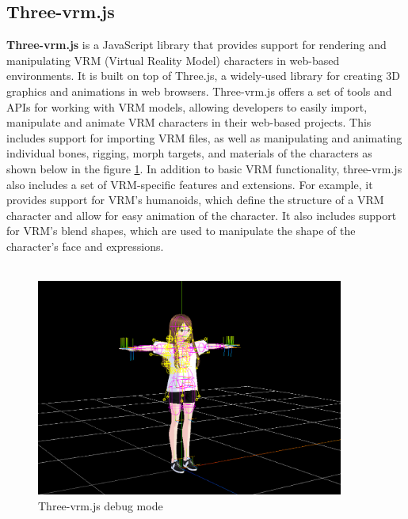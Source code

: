\subsection{Three-vrm.js}
\textbf{Three-vrm.js} is a JavaScript library that provides support for rendering 
and manipulating VRM (Virtual Reality Model) characters in web-based environments. 
It is built on top of Three.js, a widely-used library for creating 3D graphics and 
animations in web browsers.
Three-vrm.js offers a set of tools and APIs for working with VRM models, allowing 
developers to easily import, manipulate and animate VRM characters in their web-based 
projects. This includes support for importing VRM files, as well as manipulating and animating 
individual bones, rigging, morph targets, and materials of the characters as shown below in the figure \ref{fig:threevrmdebug}.
In addition to basic VRM functionality, three-vrm.js also includes a set of VRM-specific 
features and extensions. For example, it provides support for VRM's humanoids, which define 
the structure of a VRM character and allow for easy animation of the character. It also includes 
support for VRM's blend shapes, which are used to manipulate the shape of the character's 
face and expressions.
\\
\\
\begin{figure}[htb]
    \centering
    \includegraphics[width=0.9\textwidth]{pics/threevrmdebug.PNG}
    \caption{Three-vrm.js debug mode}
    \label{fig:threevrmdebug}
\end{figure}
\\
\\
